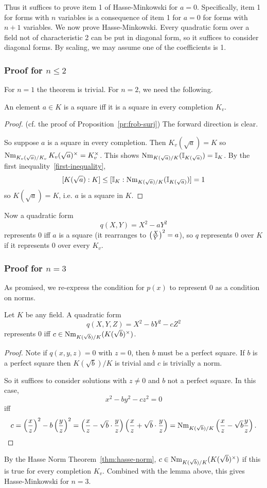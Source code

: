 Thus it suffices to prove item 1 of Hasse-Minkowski for $a=0$. Specifically, item 1 for forms with $n$ variables is a consequence of item 1 for $a=0$ for forms with $n+1$ variables.
We now prove Hasse-Minkowski. Every quadratic form over a field not of characteristic 2 can be put in diagonal form, so it suffices to consider diagonal forms. By scaling, we may assume one of the coefficients is 1.
\subsubsection{Proof for $n\le 2$}
For $n=1$ the theorem is trivial. For $n=2$, we need the following.
\begin{lem}
An element $a\in K$ is a square iff it is a square in every completion $K_v$.
\end{lem}
\begin{proof} (cf. the proof of Proposition~\ref{pr:frob-surj}) 
The forward direction is clear. 

So suppose $a$ is a square in every completion. 
Then $K_v(\sqrt{a})=K$ so $\operatorname{Nm}_{K_v(\sqrt{a})/K_v}K_v(\sqrt{a})^{\times} =K_v^{\times}$. 
This shows $\operatorname{Nm}_{K(\sqrt{a})/K}(\mathbb{I}_{K(\sqrt{a})})=\mathbb{I}_K$. By the first inequality~\ref{first-inequality},
\[
[K(\sqrt{a}):K]\le [\mathbb{I}_K:\operatorname{Nm}_{K(\sqrt{a})/K}(\mathbb{I}_{K(\sqrt{a})})]=1
\]
so $K(\sqrt{a})=K$, i.e. $a$ is a square in $K$.
\end{proof}
Now a quadratic form
\[
q(X,Y)=X^2-aY^2
\]
represents 0 iff $a$ is a square (it rearranges to $\left( {\frac{X}{Y}} \right)^2=a$), so $q$ represents 0 over $K$ if it represents 0 over every $K_v$.
\subsubsection{Proof for $n=3$}
As promised, we re-express the condition for $p(x)$ to represent 0 as a condition on norms.
\begin{lem}
Let $K$ be any field. A quadratic form 
\[
q(X,Y,Z)=X^2-bY^2-cZ^2
\]
represents 0 iff $c\in \operatorname{Nm}_{K(\sqrt b)/K}(K(\sqrt b)^{\times})$.
\end{lem}
\begin{proof}
Note if $q(x,y,z)=0$ with $z=0$, then $b$ must be a perfect square. If $b$ is a perfect square then $K(\sqrt b)/K$ is trivial and $c$ is trivially a norm.

So it suffices to consider solutions with $z\ne 0$ and $b$ not a perfect square.
In this case,
\[
x^2-by^2-cz^2=0\]
iff
\[ c=\left( {\frac{x}{z}} \right) ^2 -b\left( {\frac{y}{z}} \right)^2=\left( {\frac{x}{z}-\sqrt b\cdot \frac{y}{z}} \right)\left( {\frac{x}{z}+\sqrt b\cdot\frac{y}{z}} \right)=\operatorname{Nm}_{K(\sqrt b)/K}\left( {\frac{x}{z}-\sqrt b\frac{y}{z}} \right).
\]
\end{proof}
By the Hasse Norm Theorem~\ref{thm:hasse-norm}, $c\in \operatorname{Nm}_{K(\sqrt b)/K}(K(\sqrt b)^{\times})$ if this is true for every completion $K_v$. Combined with the lemma above, this gives Hasse-Minkowski for $n=3$.

